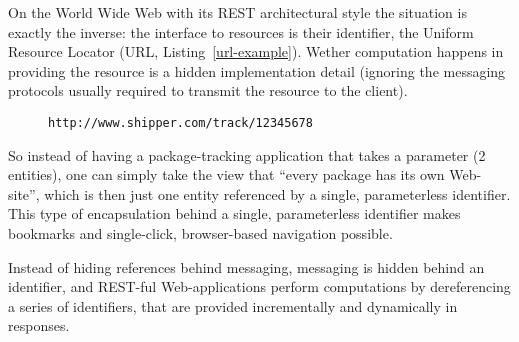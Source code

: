 \documentclass[preprint,authoryear]{acm_proc_article-sp}
\begin{document}
On the World Wide Web with its REST architectural style the situation is exactly the inverse: 
the interface to resources is their identifier, the Uniform Resource Locator (URL, Listing~\ref{url-example}).   Wether
computation happens in providing the resource is a hidden implementation detail
(ignoring the messaging protocols usually required to transmit the resource
to the client).  


\begin{figure}[htbp]
\begin{lstlisting}[style=L,label=url-example,caption=A Uniform Resource Locator.]
http://www.shipper.com/track/12345678
\end{lstlisting}
\end{figure}

So instead of having
a package-tracking application that takes a parameter (2 entities),
one can simply take the view that ``every package has its own 
Web-site'', which is then just one entity referenced by a single,
parameterless identifier.  This type of encapsulation behind
a single, parameterless identifier makes bookmarks and single-click,
browser-based navigation possible.


Instead of hiding references behind messaging,
messaging is hidden behind an identifier, and REST-ful Web-applications
perform computations by dereferencing a series of identifiers, that 
are provided incrementally and dynamically in responses.

\end{document}
